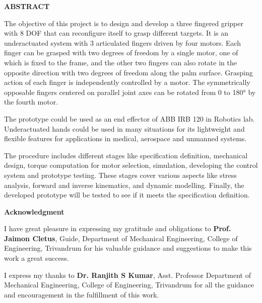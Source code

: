 \documentclass[a4paper,12pt,one side]{report}%
\begin{document}
\vspace*{1cm}
\begin{center}  {\Large \bf ABSTRACT}\end{center}
\noindent       The objective of this project is to design and develop a three fingered gripper with 8 DOF that can reconfigure itself  to grasp different targets. It is an underactuated system with 3 articulated fingers driven by four motors. Each finger can be grasped with two degrees of freedom by a single motor, one of which is fixed to the frame, and the other two fingers can also rotate in the opposite direction with two degrees of freedom along the palm surface. Grasping action of each finger is independently controlled by a motor. The symmetrically opposable fingers centered on parallel joint axes can be rotated from 0 to 180° by the fourth motor. 

The prototype could be used as an end effector of ABB IRB 120 in Robotics lab. Underactuated hands could be used in many situations for its lightweight and flexible features for applications in medical, aerospace and unmanned systems.

The procedure includes different stages like specification definition, mechanical design, torque computation for motor selection, simulation, developing the control system and prototype testing. These stages cover various aspects like stress analysis, forward and inverse kinematics, and dynamic modelling. Finally, the developed prototype will be tested to see if it meets the specification definition.



\newpage
%
%
\thispagestyle{empty}

\vspace*{1cm}
\begin{center}  {\Large \bf Acknowledgment}\end{center}
\par
I have great pleasure in expressing my gratitude and obligations to  \textbf{Prof. Jaimon Cletus}, Guide, Department of Mechanical Engineering, College of Engineering, Trivandrum  for his valuable guidance and suggestions to make this work a great success.

I express my thanks to  \textbf{Dr. Ranjith S Kumar}, Asst. Professor Department of Mechanical Engineering, College of Engineering, Trivandrum for all the guidance and encouragement  in the fulfillment of this work.
\end{document}
